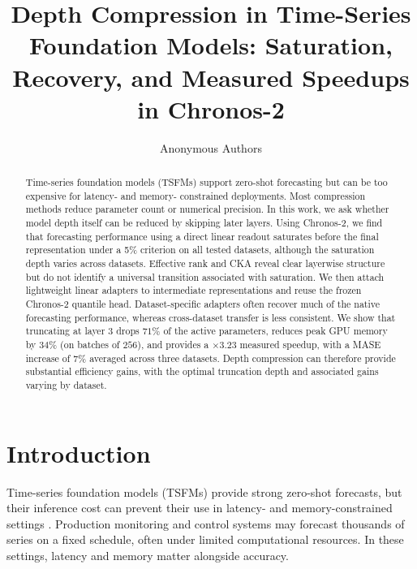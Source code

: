 \documentclass{article}
\title{Depth Compression in Time-Series Foundation Models: Saturation, Recovery, and Measured Speedups in Chronos-2}
\author{Anonymous Authors}
\begin{document}
\maketitle


\begin{abstract}
Time-series foundation models (TSFMs) support zero-shot forecasting but can be too expensive for latency- and memory- constrained deployments. Most compression methods reduce parameter count or numerical precision. In this work, we ask whether model depth itself can be reduced by skipping later layers. Using Chronos-2, we find that forecasting performance using a direct linear readout saturates before the final representation under a 5\% criterion on all tested datasets, although the saturation depth varies across datasets. Effective rank and CKA reveal clear layerwise structure but do not identify a universal transition associated with saturation. We then attach lightweight linear adapters to intermediate representations and reuse the frozen Chronos-2 quantile head. Dataset-specific adapters often recover much of the native forecasting performance, whereas cross-dataset transfer is less consistent. We show that truncating at layer 3 drops \(71\%\) of the active parameters, reduces peak GPU memory by \(34\%\) (on batches of \(256\)), and provides a \(\times 3.23\) measured speedup, with a MASE increase of \(7\%\) averaged across three datasets. Depth compression can therefore provide substantial efficiency gains, with the optimal truncation depth and associated gains varying by dataset.
\end{abstract}


\section{Introduction} \label{intro}

Time-series foundation models (TSFMs) provide strong zero-shot forecasts, but their inference cost can prevent their use in latency- and memory-constrained settings \citep{ansari2024chronoslearninglanguagetime, das2024decoderonlyfoundationmodeltimeseries, woo2024unifiedtraininguniversaltime, ansari2025chronos2univariateuniversalforecasting}. Production monitoring and control systems may forecast thousands of series on a fixed schedule, often under limited computational resources. In these settings, latency and memory matter alongside accuracy.
\end{document}

